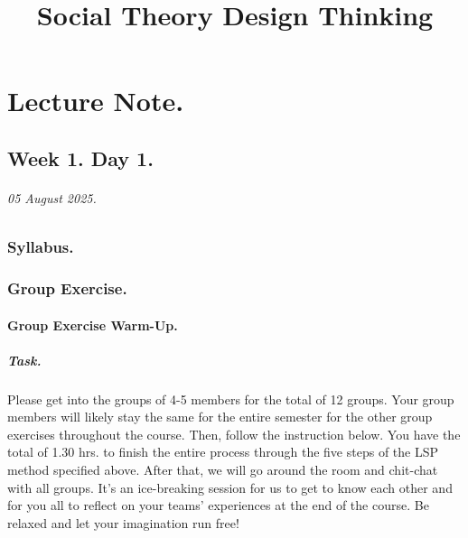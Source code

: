 \documentclass[11pt]{book}
\title{Social Theory Design Thinking}
\begin{document}
\maketitle
\tableofcontents


\part{Lecture Note.}
	\chapter{Week 1. Day 1.}
			\paragraph{05 August 2025.}
		\section{Syllabus.}
			
			
			
\pagebreak
		
		
		\section{Group Exercise.}
				
		
			\subsection{Group Exercise Warm-Up.}
				\subsubsection{Task.}
				 Please get into the groups of 4-5 members for the total of 12 groups. Your group members will likely stay the same for the entire semester for the other group exercises throughout the course. Then, follow the instruction below. You have the total of 1.30 hrs. to finish the entire process through the five steps of the LSP method specified above. After that, we will go around the room and chit-chat with all groups. It’s an ice-breaking session for us to get to know each other and for you all to reflect on your teams’ experiences at the end of the course. Be relaxed and let your imagination run free!
				 
\end{document}
